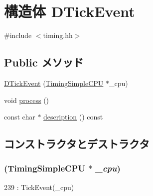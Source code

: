 \hypertarget{structTimingSimpleCPU_1_1DcachePort_1_1DTickEvent}{
\section{構造体 DTickEvent}
\label{structTimingSimpleCPU_1_1DcachePort_1_1DTickEvent}
}


{\ttfamily \#include $<$timing.hh$>$}\subsection*{Public メソッド}
\begin{DoxyCompactItemize}
\item 
\hyperlink{structTimingSimpleCPU_1_1DcachePort_1_1DTickEvent_a73c94711d024f8c0cc90d5e26de07e75}{DTickEvent} (\hyperlink{classTimingSimpleCPU_1_1TimingSimpleCPU}{TimingSimpleCPU} $\ast$\_\-cpu)
\item 
void \hyperlink{structTimingSimpleCPU_1_1DcachePort_1_1DTickEvent_a2e9c5136d19b1a95fc427e0852deab5c}{process} ()
\item 
const char $\ast$ \hyperlink{structTimingSimpleCPU_1_1DcachePort_1_1DTickEvent_a2bd90422eece9190794479e08092a252}{description} () const 
\end{DoxyCompactItemize}


\subsection{コンストラクタとデストラクタ}
\hypertarget{structTimingSimpleCPU_1_1DcachePort_1_1DTickEvent_a73c94711d024f8c0cc90d5e26de07e75}{
\subsubsection[{DTickEvent}]{ ({\bf TimingSimpleCPU} $\ast$ {\em \_\-cpu})}}
\label{structTimingSimpleCPU_1_1DcachePort_1_1DTickEvent_a73c94711d024f8c0cc90d5e26de07e75}



\begin{DoxyCode}
239                 : TickEvent(_cpu) {}
\end{DoxyCode}


